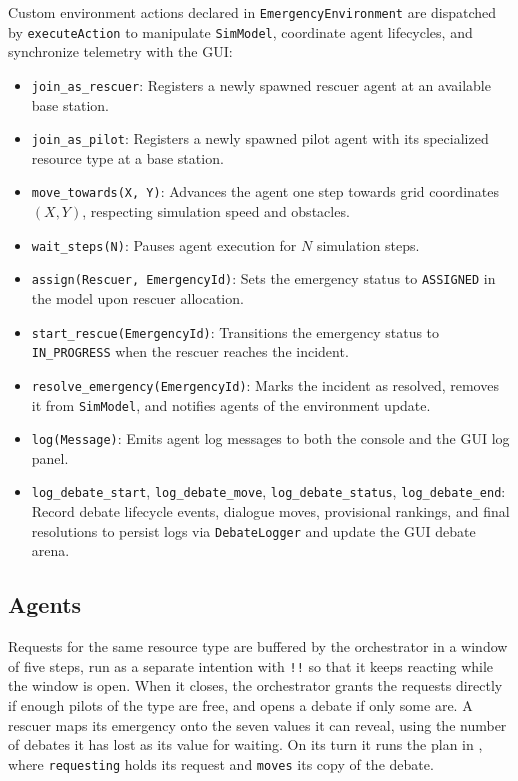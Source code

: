Custom environment actions declared in \texttt{EmergencyEnvironment} are dispatched by \texttt{executeAction} to manipulate \texttt{SimModel}, coordinate agent lifecycles, and synchronize telemetry with the GUI:
\begin{itemize}
    \item \texttt{join\_as\_rescuer}: Registers a newly spawned rescuer agent at an available base station.
    \item \texttt{join\_as\_pilot}: Registers a newly spawned pilot agent with its specialized resource type at a base station.
    \item \texttt{move\_towards(X, Y)}: Advances the agent one step towards grid coordinates $(X, Y)$, respecting simulation speed and obstacles.
    \item \texttt{wait\_steps(N)}: Pauses agent execution for $N$ simulation steps.
    \item \texttt{assign(Rescuer, EmergencyId)}: Sets the emergency status to \texttt{ASSIGNED} in the model upon rescuer allocation.
    \item \texttt{start\_rescue(EmergencyId)}: Transitions the emergency status to \texttt{IN\_PROGRESS} when the rescuer reaches the incident.
    \item \texttt{resolve\_emergency(EmergencyId)}: Marks the incident as resolved, removes it from \texttt{SimModel}, and notifies agents of the environment update.
    \item \texttt{log(Message)}: Emits agent log messages to both the console and the GUI log panel.
    \item \texttt{log\_debate\_start}, \texttt{log\_debate\_move}, \texttt{log\_debate\_status}, \texttt{log\_debate\_end}: Record debate lifecycle events, dialogue moves, provisional rankings, and final resolutions to persist logs via \texttt{DebateLogger} and update the GUI debate arena.
\end{itemize}
\subsection{Agents}\label{subsec:impl_agents}

Requests for the same resource type are buffered by the orchestrator in a window of five steps, run as a separate intention with \texttt{!!} so that it keeps reacting while the window is open.
When it closes, the orchestrator grants the requests directly if enough pilots of the type are free, and opens a debate if only some are.
A rescuer maps its emergency onto the seven values it can reveal, using the number of debates it has lost as its value for waiting.
On its turn it runs the plan in , where \texttt{requesting} holds its request and \texttt{moves} its copy of the debate.

